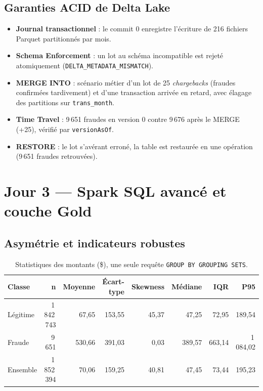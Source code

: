 \documentclass[11pt,a4paper]{article}
\newcommand{\code}[1]{\texttt{\small #1}}
\begin{document}
\subsection{Garanties ACID de Delta Lake}\label{sec:acid}
\begin{itemize}[leftmargin=*,itemsep=2pt]
  \item \textbf{Journal transactionnel} : le commit 0 enregistre l'écriture de 216 fichiers Parquet partitionnés par mois.
  \item \textbf{Schema Enforcement} : un lot au schéma incompatible est rejeté atomiquement (\code{DELTA\_METADATA\_MISMATCH}).
  \item \textbf{MERGE INTO} : scénario métier d'un lot de 25 \emph{chargebacks} (fraudes confirmées tardivement) et d'une transaction
        arrivée en retard, avec élagage des partitions sur \code{trans\_month}.
  \item \textbf{Time Travel} : 9\,651 fraudes en version 0 contre 9\,676 après le MERGE (+25), vérifié par \code{versionAsOf}.
  \item \textbf{RESTORE} : le lot s'avérant erroné, la table est restaurée en une opération (9\,651 fraudes retrouvées).
\end{itemize}

\section{Jour 3 — Spark SQL avancé et couche Gold}\label{sec:j3}

\subsection{Asymétrie et indicateurs robustes}
\begin{table}[H]
\centering\small
\begin{tabular}{@{}l r r r r r r r@{}}
\toprule
\textbf{Classe} & \textbf{n} & \textbf{Moyenne} & \textbf{Écart-type} & \textbf{Skewness} & \textbf{Médiane} & \textbf{IQR} & \textbf{P95} \\ \midrule
Légitime & 1\,842\,743 & 67,65 & 153,55 & 45,37 & 47,25 & 72,95 & 189,54 \\
Fraude & 9\,651 & 530,66 & 391,03 & 0,03 & 389,57 & 663,14 & 1\,084,02 \\
Ensemble & 1\,852\,394 & 70,06 & 159,25 & 40,81 & 47,45 & 73,44 & 195,23 \\
\bottomrule
\end{tabular}
\caption{Statistiques des montants (\$), une seule requête \code{GROUP BY GROUPING SETS}.}
\end{table}
\end{document}
